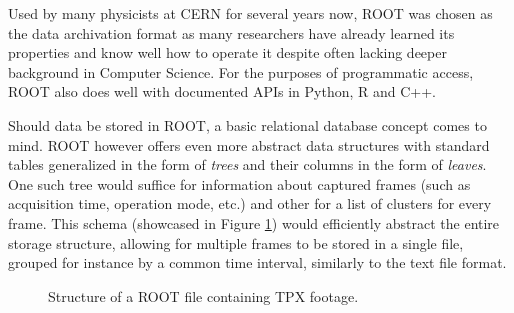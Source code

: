 
Used by many physicists at CERN for several years now, ROOT was chosen as the data archivation format as many researchers have already learned its properties and know well how to operate it despite often lacking deeper background in Computer Science. For the purposes of programmatic access, ROOT also does well with documented APIs in Python, R and C++.

Should data be stored in ROOT, a basic relational database concept comes to mind. ROOT however offers even more abstract data structures with standard tables generalized in the form of \textit{trees} and their columns in the form of \textit{leaves}. One such tree would suffice for information about captured frames (such as acquisition time, operation mode, etc.) and other for a list of clusters for every frame. This schema (showcased in Figure \ref{fig:root-trees}) would efficiently abstract the entire storage structure, allowing for multiple frames to be stored in a single file, grouped for instance by a common time interval, similarly to the text file format.

\begin{figure}[t]
\begin{center}


\caption{Structure of a ROOT file containing TPX footage.}
\label{fig:root-trees}
\end{center}
\end{figure}

